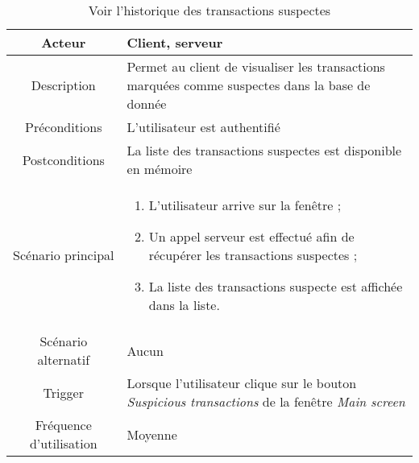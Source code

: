 \documentclass{article}
\begin{document}
\begin{table}

\begin{tabular}{|c|p{11cm}|}
\hline
Acteur & Client, serveur \\
\hline
Description & Permet au client de visualiser les transactions marquées comme suspectes dans la base de donnée \\
\hline
Préconditions & L'utilisateur est authentifié \\
\hline
Postconditions & La liste des transactions suspectes est disponible en mémoire \\
\hline
Scénario principal & \begin{enumerate}
\item L'utilisateur arrive sur la fenêtre ;
\item Un appel serveur est effectué afin de récupérer les transactions suspectes ;
\item La liste des transactions suspecte est affichée dans la liste.
\end{enumerate} \\
\hline
Scénario alternatif & Aucun \\
\hline
Trigger & Lorsque l'utilisateur clique sur le bouton \emph{Suspicious transactions} de la fenêtre \emph{Main screen} \\
\hline
Fréquence d'utilisation & Moyenne \\
\hline
\end{tabular}

\caption{Voir l'historique des transactions suspectes}

\end{table}
\end{document}
